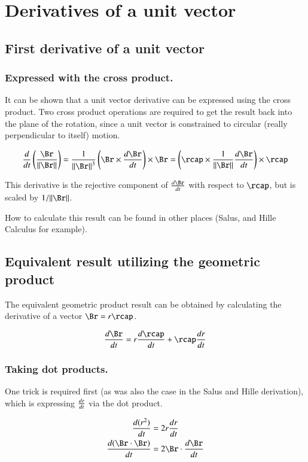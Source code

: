 \chapter{Derivatives of a unit vector}

\section{First derivative of a unit vector}

\subsection{Expressed with the cross product.}

It can be shown that a unit vector derivative can be expressed using the cross product.  Two cross product operations are required to get the result back into the plane of the rotation, since a unit vector is constrained to circular (really perpendicular to itself) motion.

\[
\dt{}\left(\frac{\Br}{\Vert \Br \Vert}\right)
= \frac{1}{{\Vert \Br \Vert}^3}\left(\Br \times \dt{\Br}\right) \times \Br
= \left(\rcap \times \frac{1}{{\Vert \Br \Vert}} \dt{\Br}\right) \times \rcap
\]

This derivative is the rejective component of $\dt{\Br}$ with respect to $\rcap$, but is scaled by $1/\Vert \Br \Vert$.

How to calculate this result can be found in other places (Salus, and Hille Calculus for example).

\section{Equivalent result utilizing the geometric product}

The equivalent geometric product result can be obtained by calculating the derivative of a vector $\Br = r \rcap$.

\[
\dt{\Br} = r \dt{\rcap} + \rcap \dt{r} 
\]

\subsection{Taking dot products.}
One trick is required first (as was also the case in the Salus and Hille derivation), which is expressing $\frac{d {r}}{dt}$ via the dot product.

\begin{align*}
\dt{(r^2)} &= 2r \dt{r} \\
\dt{(\Br \cdot \Br)} &= 2 \Br \cdot \dt{\Br} \\
\end{align*}

